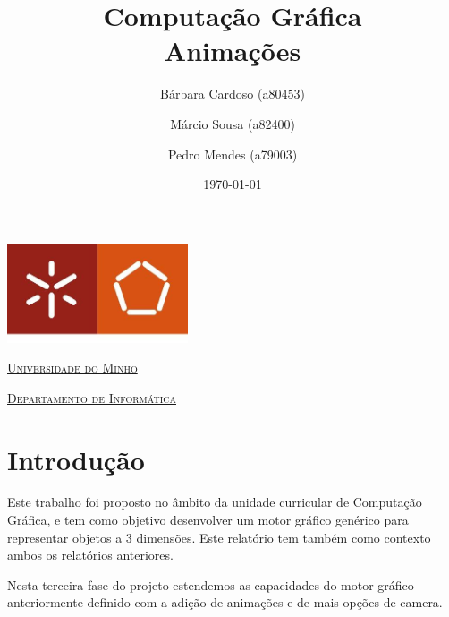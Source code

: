 \documentclass[a4paper]{article}
\begin{document}
\title{Computação Gráfica\\ Animações}
\author{Bárbara Cardoso (a80453) \and Márcio Sousa (a82400) \and Pedro Mendes (a79003)}
\date{\today}

\begin{titlepage}

    \thispagestyle{empty}
    \begin{center}
        \begin{minipage}{0.75\linewidth}
            \centering
            \includegraphics[width=0.4\textwidth]{eng.jpeg}\par\vspace{1cm}
            \vspace{1.5cm}
            \href{https://www.uminho.pt/PT}{\scshape\LARGE Universidade do Minho} \par
            \vspace{1cm}
            \href{https://www.di.uminho.pt/}{\scshape\Large Departamento de Informática} \par
            \vspace{1.5cm}

            \maketitle
        \end{minipage}
    \end{center}

\end{titlepage}

\tableofcontents

\pagebreak

\section{Introdução}
Este trabalho foi proposto no âmbito da unidade curricular de Computação Gráfica, e tem como objetivo desenvolver um motor gráfico genérico para representar objetos a 3 dimensões. Este relatório tem também como contexto ambos os relatórios anteriores.

Nesta terceira fase do projeto estendemos as capacidades do motor gráfico anteriormente definido com a adição de animações e de mais opções de camera.
\end{document}
